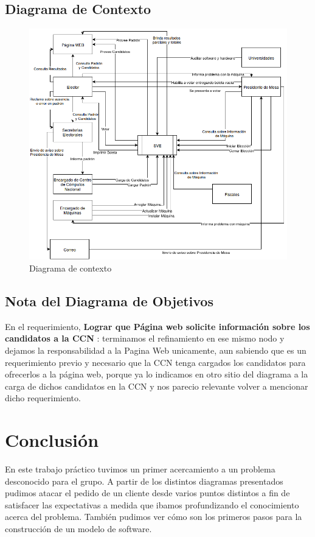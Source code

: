 \documentclass[spanish, 10pt,a4paper]{article}
\numberwithin{equation}{section} %
\begin{document}
\subsection{Diagrama de Contexto}

\begin{figure}[H]
  \centering
  \includegraphics[scale=0.50]{pdf/DiagramaDeContexto}
  \caption{Diagrama de contexto}
  \label{fig:DiagramaDeContexto}
\end{figure}

\clearpage


\subsection{Nota del Diagrama de Objetivos}

	En el requerimiento, \textbf{Lograr que Página web solicite información sobre los candidatos a la CCN} : terminamos el refinamiento en ese mismo nodo y dejamos la responsabilidad a la Pagina Web unicamente, aun sabiendo que es un requerimiento previo y necesario que la CCN tenga cargados los candidatos para ofrecerlos a la página web, porque ya lo indicamos en otro sitio del diagrama a la carga de dichos candidatos en la CCN y nos parecio relevante volver a mencionar dicho requerimiento.

\newpage
\section{Conclusión}
	En este trabajo práctico tuvimos un primer acercamiento a un problema desconocido para el grupo. A partir de los distintos diagramas presentados pudimos atacar el pedido de un cliente desde varios puntos distintos a fin de satisfacer las expectativas a medida que ibamos profundizando el conocimiento acerca del problema. También pudimos ver cómo son los primeros pasos para la construcción de un modelo de software.
	
\end{document}

